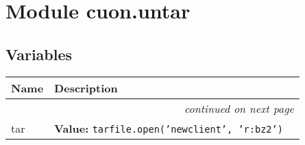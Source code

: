 %
%
%


\section{Module cuon.untar}

    \label{cuon:untar}


  \subsection{Variables}

    \vspace{-1cm}
\hspace{\varindent}\begin{longtable}{|p{\varnamewidth}|p{\vardescrwidth}|l}
\cline{1-2}
\cline{1-2} \centering \textbf{Name} & \centering \textbf{Description}& \\
\cline{1-2}
\endhead\cline{1-2}\multicolumn{3}{r}{\small\textit{continued on next page}}\\\endfoot\cline{1-2}
\endlastfoot\raggedright t\-a\-r\- & \raggedright \textbf{Value:} 
{\tt tarfile.open('newclient', 'r:bz2')}&\\
\cline{1-2}
\end{longtable}


